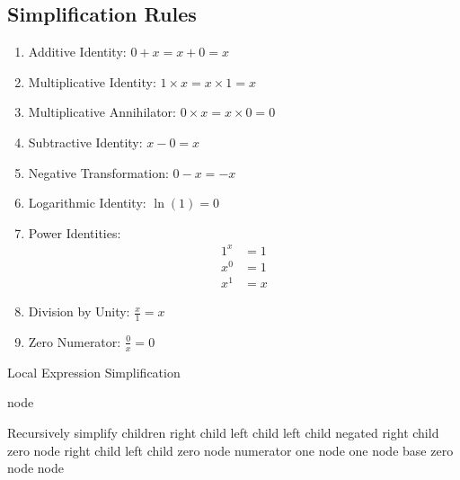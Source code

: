 \documentclass{report}
\begin{document}
\subsection*{Simplification Rules}

\begin{enumerate}
    \item Additive Identity: $0 + x = x + 0 = x$
    \item Multiplicative Identity: $1 \times x = x \times 1= x$
    \item Multiplicative Annihilator: $0 \times x = x\times 0 = 0$
    \item Subtractive Identity: $x - 0 = x$
    \item Negative Transformation: $0 - x = -x$
    \item Logarithmic Identity: $\ln(1) = 0$
    \item Power Identities:
    \begin{align*}
        1^x &= 1 \\
        x^0 &= 1 \\
        x^1 &= x
    \end{align*}
    \item Division by Unity: $\frac{x}{1} = x$
    \item Zero Numerator: $\frac{0}{x} = 0$
\end{enumerate}

\begin{algorithm}[H]
\caption{Local Expression Simplification}
\begin{algorithmic}[1]
        \State \Return node 
    \EndIf
    
    \State Recursively simplify children
         \Return right child
         \Return left child
        \EndIf
         \Return left child
         \Return negated right child
        \EndIf
         \Return zero node
         \Return right child
         \Return left child
        \EndIf
         \Return zero node
         \Return numerator
        \EndIf
         \Return one node
         \Return one node
         \Return base
        \EndIf
         \Return zero node
        \EndIf
    \EndIf
    \State \Return node 
\EndFunction
\end{algorithmic}
\end{algorithm}
\end{document}
